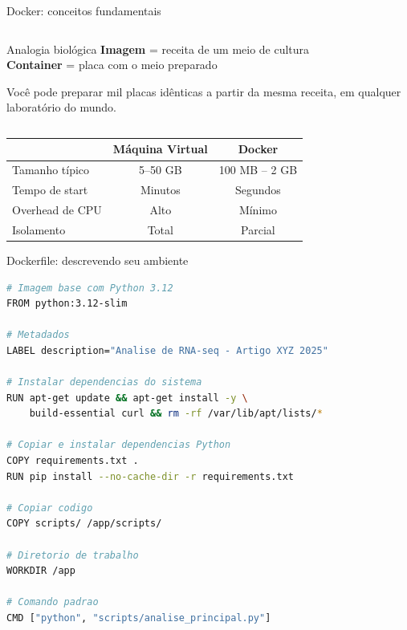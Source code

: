 \begin{frame}[fragile, shrink=25]{Docker: conceitos fundamentais}
\begin{columns}

\vspace{0.2cm}

\begin{exampleblock}{Analogia biológica}
\textbf{Imagem} = receita de um meio de cultura\\
\textbf{Container} = placa com o meio preparado

Você pode preparar mil placas idênticas a partir da mesma receita, em qualquer laboratório do mundo.
\end{exampleblock}
\end{columns}

\vspace{0.3cm}
\begin{center}
\begin{tabular}{lcc}
\toprule
& \textbf{Máquina Virtual} & \textbf{Docker} \\
\midrule
Tamanho típico & 5--50 GB & 100 MB -- 2 GB \\
Tempo de start & Minutos & Segundos \\
Overhead de CPU & Alto & Mínimo \\
Isolamento & Total & Parcial \\
\bottomrule
\end{tabular}
\end{center}
\end{frame}

\begin{frame}[fragile, shrink=25]{Dockerfile: descrevendo seu ambiente}
\begin{lstlisting}[language=bash, caption=Exemplo de Dockerfile para análise bioinformática, basicstyle=\ttfamily\footnotesize]
# Imagem base com Python 3.12
FROM python:3.12-slim

# Metadados
LABEL description="Analise de RNA-seq - Artigo XYZ 2025"

# Instalar dependencias do sistema
RUN apt-get update && apt-get install -y \
    build-essential curl && rm -rf /var/lib/apt/lists/*

# Copiar e instalar dependencias Python
COPY requirements.txt .
RUN pip install --no-cache-dir -r requirements.txt

# Copiar codigo
COPY scripts/ /app/scripts/

# Diretorio de trabalho
WORKDIR /app

# Comando padrao
CMD ["python", "scripts/analise_principal.py"]
\end{lstlisting}
\end{frame}

